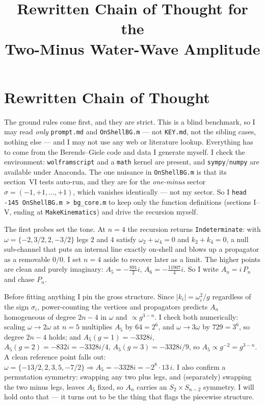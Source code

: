 \documentclass{article}
\title{Rewritten Chain of Thought for the\\
Two-Minus Water-Wave Amplitude}
\author{}
\date{}
\begin{document}
\maketitle


\section*{Rewritten Chain of Thought}

The ground rules come first, and they are strict. This is a blind benchmark, so I
may read \emph{only} \texttt{prompt.md} and \texttt{OnShellBG.m} --- not
\texttt{KEY.md}, not the sibling cases, nothing else --- and I may not use any
web or literature lookup. Everything has to come from the Berends--Giele code and
data I generate myself. I check the environment: \texttt{wolframscript} and a
\texttt{math} kernel are present, and \texttt{sympy}/\texttt{numpy} are available
under Anaconda. The one nuisance in \texttt{OnShellBG.m} is that its section~VI
tests auto-run, and they are for the \emph{one-minus} sector
$\sigma=(-1,+1,\dots,+1)$, which vanishes identically --- not my sector. So I
\texttt{head -145 OnShellBG.m > bg\_core.m} to keep only the function definitions
(sections I--V, ending at \texttt{MakeKinematics}) and drive the recursion myself.

The first probes set the tone. At $n=4$ the recursion returns
\texttt{Indeterminate}: with $\omega=\{-2,3/2,2,-3/2\}$ legs $2$ and $4$ satisfy
$\omega_2+\omega_4=0$ and $k_2+k_4=0$, a null sub-channel that puts an internal
line exactly on-shell and blows up a propagator as a removable $0/0$. I set $n=4$
aside to recover later as a limit. The higher points are clean and purely
imaginary: $A_5=-\tfrac{891}{2}i$, $A_6=-\tfrac{11907}{4}i$. So I write
$A_n=i\,P_n$ and chase $P_n$.

Before fitting anything I pin the gross structure. Since $|k_i|=\omega_i^2/g$
regardless of the sign $\sigma_i$, power-counting the vertices and propagators
predicts $A_n$ homogeneous of degree $2n-4$ in $\omega$ and $\propto g^{3-n}$. I
check both numerically: scaling $\omega\to2\omega$ at $n=5$ multiplies $A_5$ by
$64=2^6$, and $\omega\to3\omega$ by $729=3^6$, so degree $2n-4$ holds; and
$A_5(g{=}1)=-3328i$, $A_5(g{=}2)=-832i=-3328i/4$, $A_5(g{=}3)=-3328i/9$, so
$A_5\propto g^{-2}=g^{3-n}$. A clean reference point falls out:
$\omega=\{-13/2,2,3,5,-7/2\}\Rightarrow A_5=-3328i=-2^8\cdot13\,i$. I also confirm
a permutation symmetry: swapping any two plus legs, and (separately) swapping the
two minus legs, leaves $A_5$ fixed, so $A_n$ carries an $S_2\times S_{n-2}$
symmetry. I will hold onto that --- it turns out to be the thing that flags the
piecewise structure.
\end{document}
